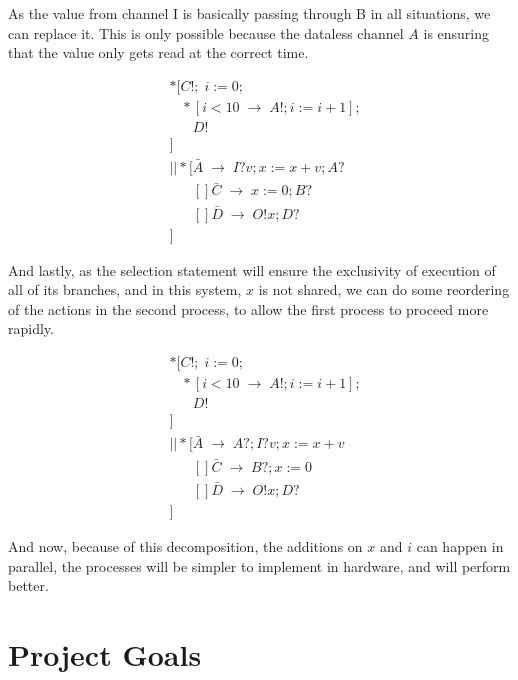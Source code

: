 \documentclass[times,10pt]{article}
\begin{document}
As the value from channel I is basically passing through B in all situations, we can replace it.  This is only possible because the dataless channel $A$ is ensuring that the value only gets read at the correct time.

\begin{align*}
&*[ C!; \;  i := 0;\\
& \;\;\;*[ i < 10\; \rightarrow\; A!; i := i + 1];\\
& \;\;\;\;\;\;D!\\
& ]\\
&|| *[ \bar{A} \; \rightarrow\; I?v; x := x+v; A?\\
&\;\;\;\;\;\;[] \bar{C} \; \rightarrow\; x := 0; B?\\
& \;\;\;\;\;\;[] \bar{D}\; \rightarrow\; O!x; D? \\
&  ]
\end{align*}

And lastly, as the selection statement will ensure the exclusivity of execution of all of its branches, and in this system, $x$ is not shared, we can do some reordering of the actions in the second process, to allow the first process to proceed more rapidly.

\begin{align*}
&*[ C!; \; i := 0;\\
& \;\;\;*[ i < 10\; \rightarrow\; A!; i := i + 1];\\
& \;\;\;\;\;\;D!\\
& ]\\
&|| *[ \bar{A} \; \rightarrow\; A?; I?v; x := x+v\\
&\;\;\;\;\;\;[] \bar{C} \; \rightarrow\; B?; x := 0\\
& \;\;\;\;\;\;[] \bar{D}\; \rightarrow\; O!x; D? \\
&  ]
\end{align*}

And now, because of this decomposition, the additions on $x$ and $i$ can happen in parallel, the processes will be simpler to implement in hardware, and will perform better.

\section{Project Goals}
\end{document}
